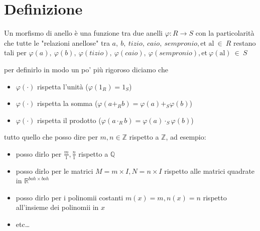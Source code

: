 \documentclass[11pt]{article}
\date{\today}
\title{}
\begin{document}
\tableofcontents

\section{Definizione}
\label{sec:org6906c29}
Un morfismo di anello è una funzione tra due anelli
\(\varphi : R \to S\) con la particolarità che tutte le "relazioni
anellose" tra   \(a,\ b,\ tizio,\ caio,\ sempronio,\text{et\ al}\ \in\ R\)
restano tali per \(\varphi(a),\ \varphi(b),\
\varphi(tizio),\ \varphi(caio),\ \varphi(sempronio),
\text{et}\ \varphi(\text{al})\ \in\ S\)

per definirlo in modo un po' più rigoroso diciamo che
\begin{itemize}
\item \(\varphi(\cdot)\) rispetta l'unità (\(\varphi(1_R) = 1_S\))
\item \(\varphi(\cdot)\) rispetta la somma (\(\varphi(a + _R b) = \varphi(a) + _S \varphi(b)\))
\item \(\varphi(\cdot)\) rispetta il prodotto (\(\varphi(a \cdot _R b) = \varphi(a) \cdot _S \varphi(b)\))
\end{itemize}

tutto quello che posso dire per \(m,n \in \mathbb{Z}\) rispetto a \(\mathbb{Z}\), ad esempio: 
\begin{itemize}
\item posso dirlo per \(\frac{m}{1}, \frac{n}{1}\) rispetto a \(\mathbb{Q}\)
\item posso dirlo per le matrici \(M = m \times I, N = n \times I\)
rispetto alle matrici quadrate in \(\mathbb{R}^{boh \times boh}\)
\item posso dirlo per i polinomii costanti \(m(x) = m, n(x) = n\) rispetto
all'insieme dei polinomii in \(x\)
\item etc\ldots{}
\end{itemize}
\end{document}
